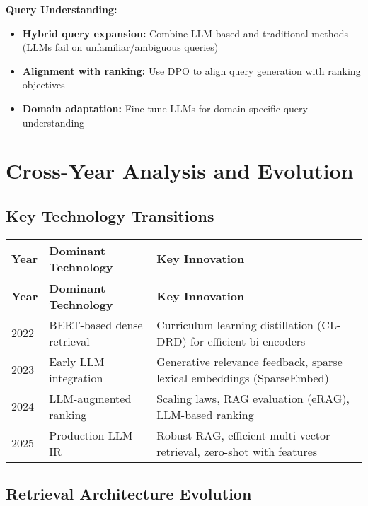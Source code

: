\documentclass[11pt,letterpaper]{article}
\begin{document}
\textbf{Query Understanding:}
\begin{itemize}[leftmargin=*]
    \item \textbf{Hybrid query expansion:} Combine LLM-based and traditional methods (LLMs fail on unfamiliar/ambiguous queries)
    \item \textbf{Alignment with ranking:} Use DPO to align query generation with ranking objectives
    \item \textbf{Domain adaptation:} Fine-tune LLMs for domain-specific query understanding
\end{itemize}

\newpage

\section{Cross-Year Analysis and Evolution}

\subsection{Key Technology Transitions}

\begin{center}
\begin{longtable}{|p{3cm}|p{5cm}|p{5cm}|}
\hline
\textbf{Year} & \textbf{Dominant Technology} & \textbf{Key Innovation} \\
\hline
\endfirsthead
\hline
\textbf{Year} & \textbf{Dominant Technology} & \textbf{Key Innovation} \\
\hline
\endhead
\hline
\endfoot

\textcolor{year2022}{2022} & BERT-based dense retrieval & Curriculum learning distillation (CL-DRD) for efficient bi-encoders \\
\hline
\textcolor{year2023}{2023} & Early LLM integration & Generative relevance feedback, sparse lexical embeddings (SparseEmbed) \\
\hline
\textcolor{year2024}{2024} & LLM-augmented ranking & Scaling laws, RAG evaluation (eRAG), LLM-based ranking \\
\hline
\textcolor{year2025}{2025} & Production LLM-IR & Robust RAG, efficient multi-vector retrieval, zero-shot with features \\
\hline
\end{longtable}
\end{center}

\subsection{Retrieval Architecture Evolution}
\end{document}
